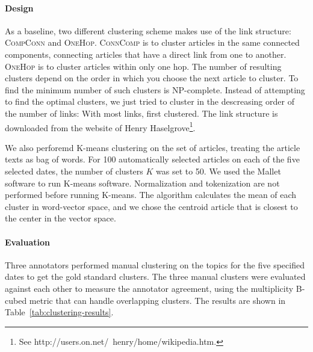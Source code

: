 \documentclass[11pt]{article}
\begin{document}
\paragraph{Design}
As a baseline, two different clustering scheme makes use of the link structure: \textsc{CompConn} and \textsc{OneHop}.
\textsc{ConnComp} is to cluster articles in the same connected components, connecting articles that have a direct link from one to another.
\textsc{OneHop} is to cluster articles within only one hop.
The number of resulting clusters depend on the order in which you choose the next article to cluster.
To find the minimum number of such clusters is NP-complete.
Instead of attempting to find the optimal clusters,
we just tried to cluster in the descreasing order of the number of links: With most links, first clustered.
The link structure is downloaded from the website of Henry Haselgrove\footnote{See http://users.on.net/~henry/home/wikipedia.htm.}.

We also perforemd K-means clustering on the set of articles, treating the article texts as bag of words.
For 100 automatically selected articles on each of the five selected dates,
the number of clusters $K$ was set to 50.
We used the Mallet \cite{McCallumMALLET} software to run K-means software.
Normalization and tokenization are not performed before running K-means.
The algorithm calculates the mean of each cluster in word-vector space,
and we chose the centroid article that is closest to the center in the vector space.

\paragraph{Evaluation}
Three annotators performed manual clustering on the topics for the five specified dates to get the gold standard clusters.
The three manual clusters were evaluated against each other to measure the annotator agreement,
using the multiplicity B-cubed metric \cite{amigo09} that can handle overlapping clusters.
The results are shown in Table~\ref{tab:clustering-results}.
\end{document}
